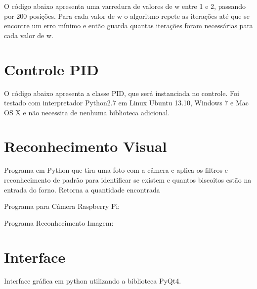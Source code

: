 O código abaixo apresenta uma varredura de valores de w entre 1 e 2, passando por 200 posições. Para cada valor de w o algoritmo repete as iterações até que se encontre um erro mínimo e então guarda quantas iterações foram necessárias para cada valor de w.

\singlespacing

\doublespacing

\section{Controle PID}

O código abaixo apresenta a classe PID, que será instanciada no controle. Foi testado com interpretador Python2.7 em Linux Ubuntu 13.10, Windows 7 e Mac OS X e não necessita de nenhuma biblioteca adicional.

\singlespacing

\doublespacing

\section{Reconhecimento Visual}\label{alg:camera}

Programa em Python que tira uma foto com a câmera e aplica os filtros e reconhecimento de padrão para identificar se existem e quantos biscoitos estão na entrada do forno. Retorna a quantidade encontrada

Programa para Câmera Raspberry Pi:

\singlespacing

\doublespacing

Programa Reconhecimento Imagem:

\singlespacing

\doublespacing

\section{Interface}

Interface gráfica em python utilizando a biblioteca PyQt4. 

\singlespacing

\doublespacing
